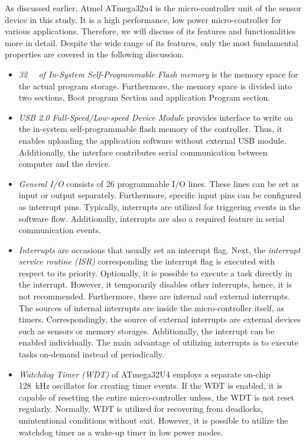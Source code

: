 \documentclass[english,12pt,a4paper,pdftex,elec,utf8]{aaltothesis}
\begin{document}
As discussed earlier, Atmel ATmega32u4 \cite{atmega32u4datasheet} is the micro-controller unit of the sensor device in this study. It is a high performance, low power micro-controller for various applications. Therefore, we will discuss of its features and functionalities more in detail. Despite the wide range of its features, only the most fundamental properties are covered in the following discussion.


\begin{itemize}
\item \textit{\SI{32}{\kilo\byte} of In-System Self-Programmable Flash memory} is the memory space for the actual program storage. Furthermore, the memory space is divided into two sections, Boot program Section and application Program section. 

\item \textit{USB 2.0 Full-Speed/Low-speed Device Module} provides interface to write on the in-system self-programmable flash memory of the controller. Thus, it enables uploading the application software without external USB module. Additionally, the interface contributes serial communication between computer and the device.

\item \textit{General I/O} consists of 26 programmable I/O lines. These lines can be set as input or output separately. Furthermore, specific input pins can be configured as interrupt pins. Typically, interrupts are utilized for triggering events in the software flow. Additionally, interrupts are also a required feature in serial communication events.

\item \textit{Interrupts} are occasions that usually set an interrupt flag. Next, the \textit{interrupt service routine (ISR)} corresponding the interrupt flag is executed with respect to its priority. Optionally, it is possible to execute a task directly in the interrupt. However, it temporarily disables other interrupts, hence, it is not recommended. Furthermore, there are internal and external interrupts. The sources of internal interrupts are inside the micro-controller itself, as timers. Correspondingly, the source of external interrupts are external devices such as sensors or memory storages. Additionally, the interrupt can be enabled individually. The main advantage of utilizing interrupts is to execute tasks on-demand instead of periodically.

\item \textit{Watchdog Timer (WDT)} of ATmega32U4 employs a separate on-chip \SI{128}{\kilo \hertz} oscillator for creating timer events. If the WDT is enabled, it is capable of resetting the entire micro-controller unless, the WDT is not reset regularly. Normally, WDT is utilized for recovering from deadlocks, unintentional conditions without exit. However, it is possible to utilize the watchdog timer as a wake-up timer in low power modes.



\end{itemize}
\end{document}
